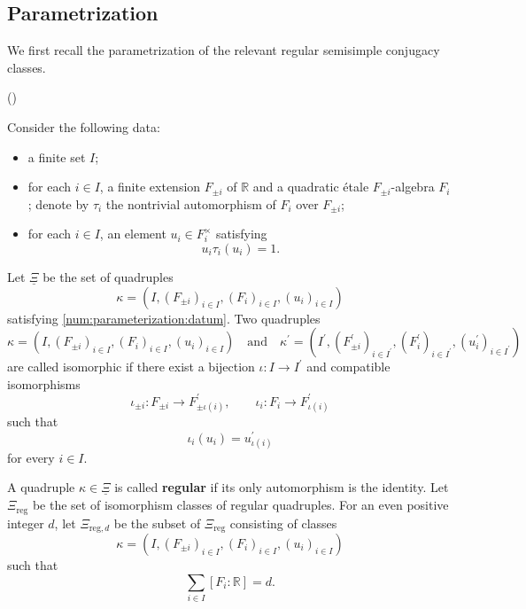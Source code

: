 \documentclass[12pt]{amsart}
\numberwithin{equation}{subsection}
\newcounter{keepeqno}
\newenvironment{num}
 {\setcounter{keepeqno}{\value{equation}}%
  \begin{list}{(\theequation)}{\usecounter{equation}}%
  \setcounter{equation}{\value{keepeqno}}}
 {\end{list}}
\newcommand{\BR}{{\mathbb {R}}}
\newcommand{\reg}{{\mathrm{reg}}}
\newcommand{\udl}{\underline}
\def\p{\prime}
\begin{document}
\subsection{Parametrization}\label{subsec:parametrization}

We first recall the parametrization of the relevant regular semisimple
conjugacy classes.

\begin{num}
\item\label{num:parameterization:datum}
Consider the following data:
\begin{itemize}
\item a finite set $I$;

\item for each $i\in I$, a finite extension $F_{\pm i}$ of $\BR$ and a
quadratic étale $F_{\pm i}$-algebra $F_i$; denote by $\tau_i$ the nontrivial
automorphism of $F_i$ over $F_{\pm i}$;

\item for each $i\in I$, an element $u_i\in F_i^\times$ satisfying
\[
u_i\tau_i(u_i)=1.
\]
\end{itemize}
\end{num}

Let $\udl{\Xi}$ be the set of quadruples
\[
\kappa=(I,(F_{\pm i})_{i\in I},(F_i)_{i\in I},(u_i)_{i\in I})
\]
satisfying \ref{num:parameterization:datum}. Two quadruples
\[
\kappa=(I,(F_{\pm i})_{i\in I},(F_i)_{i\in I},(u_i)_{i\in I})
\quad \text{and}\quad 
\kappa^\p=(I^\p,(F^\p_{\pm i})_{i\in I^\p},(F^\p_i)_{i\in I^\p},
(u^\p_i)_{i\in I^\p})
\]
are called isomorphic if there exist a bijection $\iota:I\to I^\p$ and
compatible isomorphisms
\[
\iota_{\pm i}:F_{\pm i}\to F^\p_{\pm\iota(i)},\qquad
\iota_i:F_i\to F^\p_{\iota(i)}
\]
such that
\[
\iota_i(u_i)=u^\p_{\iota(i)}
\]
for every $i\in I$.

A quadruple $\kappa\in \udl{\Xi}$ is called \textbf{regular} if its only
automorphism is the identity. Let $\Xi_\reg$ be the set of isomorphism classes
of regular quadruples. For an even positive integer $d$, let $\Xi_{\reg,d}$ be
the subset of $\Xi_\reg$ consisting of classes
\[
\kappa=(I,(F_{\pm i})_{i\in I},(F_i)_{i\in I},(u_i)_{i\in I})
\]
such that
\[
\sum_{i\in I}[F_i:\BR]=d.
\]
\end{document}

